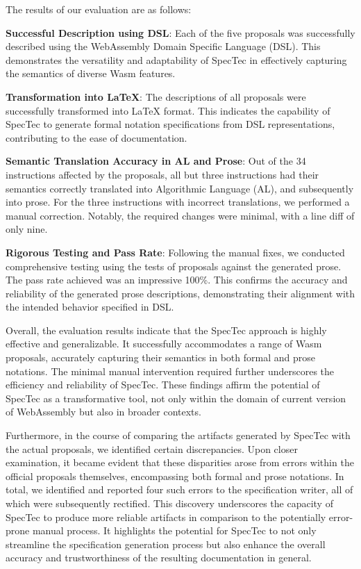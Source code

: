 The results of our evaluation are as follows:

\textbf{Successful Description using DSL}: Each of the five proposals was
successfully described using the WebAssembly Domain Specific Language (DSL).
This demonstrates the versatility and adaptability of SpecTec in effectively
capturing the semantics of diverse Wasm features.

\textbf{Transformation into LaTeX}: The descriptions of all proposals were
successfully transformed into LaTeX format. This indicates the capability of
SpecTec to generate formal notation specifications from DSL representations,
contributing to the ease of documentation.

\textbf{Semantic Translation Accuracy in AL and Prose}: Out of the 34
instructions affected by the proposals, all but three instructions had their
semantics correctly translated into Algorithmic Language (AL), and subsequently
into prose. For the three instructions with incorrect translations, we
performed a manual correction. Notably, the required changes were minimal, with
a line diff of only nine.

\textbf{Rigorous Testing and  Pass Rate}: Following the manual
fixes, we conducted comprehensive testing using the tests of proposals against
the generated prose. The pass rate achieved was an impressive 100\%. This
confirms the accuracy and reliability of the generated prose descriptions,
demonstrating their alignment with the intended behavior specified in DSL.

Overall, the evaluation results indicate that the SpecTec approach is highly
effective and generalizable. It successfully accommodates a range of Wasm
proposals, accurately capturing their semantics in both formal and prose
notations. The minimal manual intervention required further underscores the
efficiency and reliability of SpecTec. These findings affirm the potential of
SpecTec as a transformative tool, not only within the domain of current version
of WebAssembly but also in broader contexts.

Furthermore, in the course of comparing the artifacts generated by SpecTec with
the actual proposals, we identified certain discrepancies. Upon closer
examination, it became evident that these disparities arose from errors within
the official proposals themselves, encompassing both formal and prose
notations. In total, we identified and reported four such errors to the
specification writer, all of which were subsequently rectified. This discovery
underscores the capacity of SpecTec to produce more reliable artifacts in
comparison to the potentially error-prone manual process. It highlights the
potential for SpecTec to not only streamline the specification generation
process but also enhance the overall accuracy and trustworthiness of the
resulting documentation in general.


